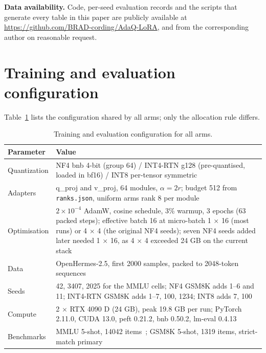 \documentclass[preprint,12pt]{elsarticle}
\begin{document}
\noindent\textbf{Data availability.} {\small Code, per-seed evaluation records and the scripts that generate every table in this paper are publicly available at \url{https://github.com/BRAD-cording/AdaQ-LoRA}, and from the corresponding author on reasonable request.}

\clearpage
\appendix
\section{Training and evaluation configuration}
\label{app:config}

Table~\ref{tab:training_config} lists the configuration shared by all arms; only the allocation rule differs.

\begin{table}[H]
\centering
\caption{Training and evaluation configuration for all arms.}
\label{tab:training_config}
\footnotesize
\begin{tabular}{lp{9.2cm}}
\toprule
\textbf{Parameter} & \textbf{Value} \\
\midrule
Quantization  & NF4 bnb 4-bit (group 64) / INT4-RTN g128 (pre-quantised, loaded in bf16) / INT8 per-tensor symmetric \\
Adapters      & q\_proj and v\_proj, 64 modules, $\alpha=2r$; budget 512 from \texttt{ranks.json}, uniform arms rank 8 per module \\
Optimisation  & $2\times10^{-4}$ AdamW, cosine schedule, 3\% warmup, 3 epochs (63 packed steps); effective batch 16 at micro-batch 1 $\times$ 16 (most runs) or 4 $\times$ 4 (the original NF4 seeds); seven NF4 seeds added later needed 1 $\times$ 16, as 4 $\times$ 4 exceeded 24 GB on the current stack \\
Data          & OpenHermes-2.5, first 2000 samples, packed to 2048-token sequences~\citep{teknium2023openhermes} \\
Seeds         & 42, 3407, 2025 for the MMLU cells; NF4 GSM8K adds 1--6 and 11; INT4-RTN GSM8K adds 1--7, 100, 1234; INT8 adds 7, 100 \\
Compute       & 2 $\times$ RTX 4090 D (24 GB), peak 19.8 GB per run; PyTorch 2.11.0, CUDA 13.0, peft 0.21.2, bnb 0.50.2, lm-eval 0.4.13 \\
Benchmarks    & MMLU 5-shot, 14042 items~\citep{hendrycks2021mmlu}; GSM8K 5-shot, 1319 items, strict-match primary~\citep{cobbe2021gsm8k} \\
\bottomrule
\end{tabular}
\end{table}
\end{document}

